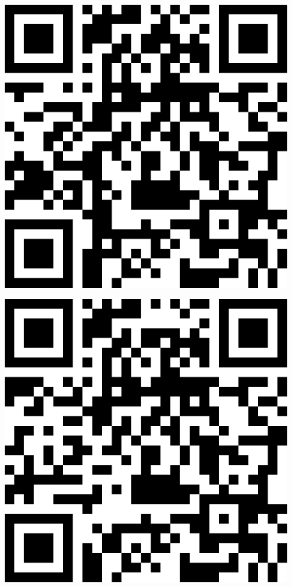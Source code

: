 \documentclass[letterpaper]{article}
\begin{document}
 \endgroup 
 \vspace*{\fill} 
 \pagebreak 
{} 
 \vspace*{\fill} 
 \begingroup 
 \centerline{\includegraphics[scale=1,width=5in,height=5in]{ICL3.png}} 
 \endgroup 
 \vspace*{\fill} 
 \pagebreak 
{} 
 \vspace*{\fill} 
 \begingroup 
 \centerline{\includegraphics[scale=1,width=5in,height=5in]{ICL4.png}} 
\end{document}

